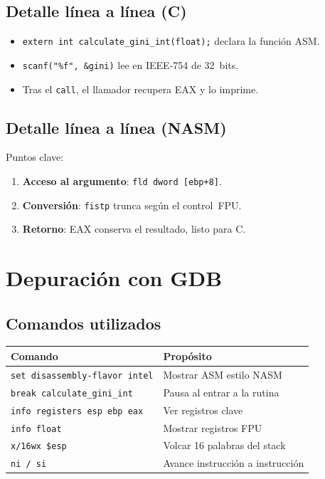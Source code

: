 \documentclass[a4paper,12pt]{article}
\begin{document}
\subsection{Detalle línea a línea (C)}
\begin{itemize}[leftmargin=*]
  \item \lstinline|extern int calculate_gini_int(float);| declara la función ASM.
  \item \lstinline|scanf("%f", &gini)| lee en IEEE‑754 de 32 bits.
  \item Tras el \texttt{call}, el llamador recupera EAX y lo imprime.
\end{itemize}

\subsection{Detalle línea a línea (NASM)}


Puntos clave:
\begin{enumerate}[label=\arabic*.]
  \item \textbf{Acceso al argumento}: \lstinline|fld dword [ebp+8]|.
  \item \textbf{Conversión}: \lstinline|fistp| trunca según el control FPU.
  \item \textbf{Retorno}: EAX conserva el resultado, listo para C.
\end{enumerate}

\section{Depuración con GDB}
\subsection{Comandos utilizados}
\begin{tabular}{@{}ll@{}}
\toprule
\textbf{Comando} & \textbf{Propósito} \\ \midrule
\lstinline|set disassembly-flavor intel| & Mostrar ASM estilo NASM \\
\lstinline|break calculate_gini_int| & Pausa al entrar a la rutina \\
\lstinline|info registers esp ebp eax| & Ver registros clave \\
\lstinline|info float| & Mostrar registros FPU \\
\lstinline|x/16wx $esp| & Volcar 16 palabras del stack \\
\lstinline|ni / si| & Avance instrucción a instrucción \\
\bottomrule
\end{tabular}
\end{document}
